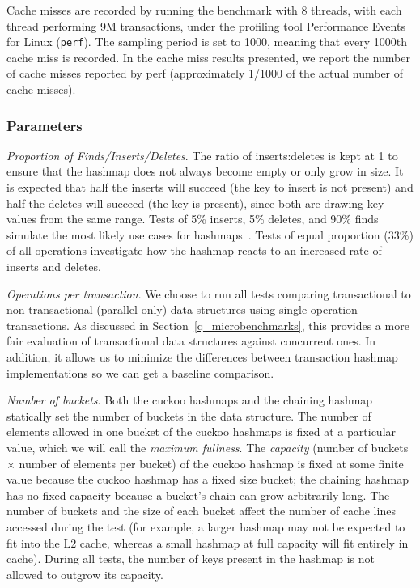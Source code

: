 Cache misses are recorded by running the benchmark with 8 threads, with each thread performing 9M transactions, under the profiling tool Performance Events for Linux (\texttt{perf}). The sampling period is set to 1000, meaning that every 1000th cache miss is recorded.
In the cache miss results presented, we report the number of cache misses reported by perf (approximately 1/1000 of the actual number of cache misses).

\subsubsection{Parameters}

    \emph{Proportion of Finds/Inserts/Deletes}. The ratio of inserts:deletes is kept at 1 to ensure that the hashmap does not always become empty or only grow in size. It is expected that half the inserts will succeed (the key to insert is not present) and half the deletes will succeed (the key is present), since both are drawing key values from the same range. Tests of 5\% inserts, 5\% deletes, and 90\% finds simulate the most likely use cases for hashmaps~\cite{hm1}. Tests of equal proportion (33\%) of all operations investigate how the hashmap reacts to an increased rate of inserts and deletes.

\emph{Operations per transaction}. We choose to run all tests comparing transactional to non-transactional (parallel-only) data structures using single-operation transactions. As discussed in Section~\ref{q_microbenchmarks}, this provides a more fair evaluation of transactional data structures against concurrent ones. In addition, it allows us to minimize the differences between transaction hashmap implementations so we can get a baseline comparison.

\emph{Number of buckets}. Both the cuckoo hashmaps and the chaining hashmap statically set the number of buckets in the data structure. The number of elements allowed in one bucket of the cuckoo hashmaps is fixed at a particular value, which we will call the \emph{maximum fullness}. 
        The \emph{capacity} (number of buckets $\times$ number of elements per bucket) of the cuckoo hashmap is fixed at some finite value because the cuckoo hashmap has a fixed size bucket; the chaining hashmap has no fixed capacity because a bucket's chain can grow arbitrarily long.
        The number of buckets and the size of each bucket affect the number of cache lines accessed during the test (for example, a larger hashmap may not be expected to fit into the L2 cache, whereas a small hashmap at full capacity will fit entirely in cache). During all tests, the number of keys present in the hashmap is not allowed to outgrow its capacity.
    
